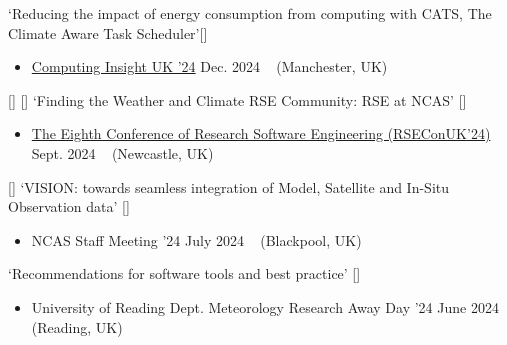 \begin{talks}
    \talk
	{\faCommentingO \hspace{0.2mm} `Reducing the impact of energy consumption from computing with CATS, The Climate Aware Task Scheduler'[\href{https://github.com/sadielbartholomew/sadielbartholomew/blob/master/talks-and-workshops/ciuk24-reducing-carbon-impact-cats.pdf}{\small{\linkSymbol}}]}
	{
	\begin{itemize}[leftmargin=.4in]
	    \item \href{https://web.cvent.com/event/009945f6-7796-4bc8-aa43-8d7a64287c7b/websitePage:caaebd05-0233-4466-9ebf-d7dbd1edfdd4}{Computing Insight UK '24}
	    \hfill Dec. 2024 ~ (Manchester, UK)
	\end{itemize}
	}

    \talk
	{\faCommentingO \hspace{1mm} [\faUserPlus] \hspace{1mm} [\faEnvelopeO] \hspace{1mm} `Finding the Weather and Climate RSE Community: RSE at NCAS' [\href{https://docs.google.com/presentation/d/1EroCJEARScMQy9Sjqnuubzx4VeOEazJ9U4f8JuYnByo/edit#slide=id.p}{\small{\linkSymbol}}]}
	{
	\begin{itemize}[leftmargin=.4in]
	    \item \href{https://rsecon24.society-rse.org/}{The Eighth Conference of Research Software Engineering (RSEConUK'24)}
	    \hfill Sept. 2024 ~ (Newcastle, UK)
	\end{itemize}
	}

    \talk
	{\faCommentingO \hspace{1mm} [\faUserPlus] \hspace{1mm} `VISION: towards seamless integration of Model, Satellite and In-Situ Observation data' [\href{https://github.com/sadielbartholomew/sadielbartholomew/blob/master/talks-and-workshops/ncas-agm-24-vision-team-talk.pdf}{\small{\linkSymbol}}]}
	{
	\begin{itemize}[leftmargin=.4in]
	    \item NCAS Staff Meeting '24
	    \hfill July 2024 ~ (Blackpool, UK)
	\end{itemize}
	}

    \talk
	{\faCommentingO \hspace{1mm} `Recommendations for software tools and best practice' [\href{https://github.com/sadielbartholomew/sadielbartholomew/blob/master/talks-and-workshops/met_away_day_24_tools_best_prac.pdf}{\small{\linkSymbol}}]}
	{
	\begin{itemize}[leftmargin=.4in]
	    \item University of Reading Dept. Meteorology Research Away Day '24
	    \hfill June 2024 ~ (Reading, UK)
	\end{itemize}
	}


\end{talks}
